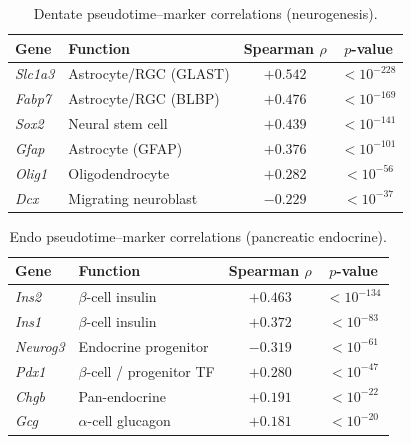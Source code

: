 \documentclass[biology,article,submit,pdftex]{Definitions/mdpi}
\begin{document}
\begin{table}[!t]
    \centering
    \caption{Dentate pseudotime--marker correlations (neurogenesis).}
    \label{tab:dentate_markers}
    \begin{tabular}{llcc}
        \toprule
        Gene & Function & Spearman $\rho$ & $p$-value \\
        \midrule
        \textit{Slc1a3} & Astrocyte/RGC (GLAST)  & $+0.542$ & $< 10^{-228}$ \\
        \textit{Fabp7}  & Astrocyte/RGC (BLBP)   & $+0.476$ & $< 10^{-169}$ \\
        \textit{Sox2}   & Neural stem cell        & $+0.439$ & $< 10^{-141}$ \\
        \textit{Gfap}   & Astrocyte (GFAP)        & $+0.376$ & $< 10^{-101}$ \\
        \textit{Olig1}  & Oligodendrocyte         & $+0.282$ & $< 10^{-56}$  \\
        \textit{Dcx}    & Migrating neuroblast    & $-0.229$ & $< 10^{-37}$  \\
        \bottomrule
    \end{tabular}
\end{table}

\begin{table}[!t]
    \centering
    \caption{Endo pseudotime--marker correlations (pancreatic endocrine).}
    \label{tab:endo_markers}
    \begin{tabular}{llcc}
        \toprule
        Gene & Function & Spearman $\rho$ & $p$-value \\
        \midrule
        \textit{Ins2}    & $\beta$-cell insulin        & $+0.463$ & $< 10^{-134}$ \\
        \textit{Ins1}    & $\beta$-cell insulin        & $+0.372$ & $< 10^{-83}$  \\
        \textit{Neurog3} & Endocrine progenitor        & $-0.319$ & $< 10^{-61}$  \\
        \textit{Pdx1}    & $\beta$-cell / progenitor TF & $+0.280$ & $< 10^{-47}$  \\
        \textit{Chgb}    & Pan-endocrine               & $+0.191$ & $< 10^{-22}$  \\
        \textit{Gcg}     & $\alpha$-cell glucagon      & $+0.181$ & $< 10^{-20}$  \\
        \bottomrule
    \end{tabular}
\end{table}
\end{document}
